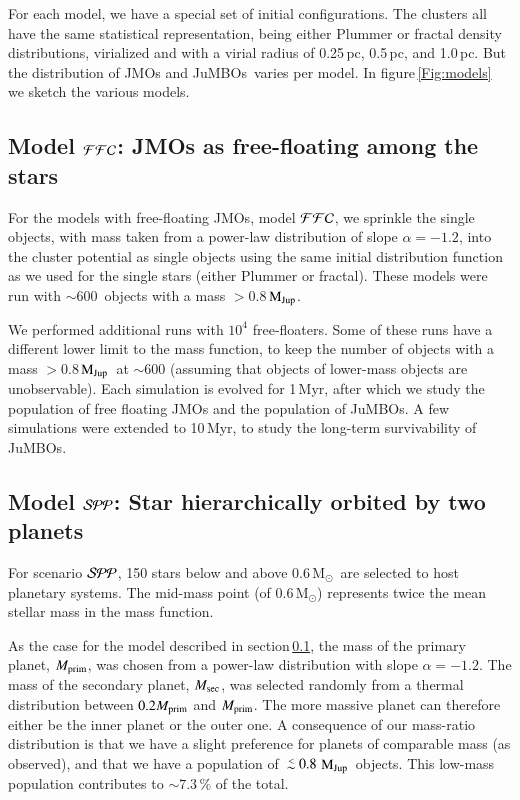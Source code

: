 \documentclass[submission,phys]{lib/SciPost}
\newcommand{\MSun}{\mbox{$\mathrm{{M}}_\odot$}}
\newcommand{\MJup}{\mbox{$\mathrm{{M}}_{\rm Jup}$}}
\def\aplt{\ {\raise-.5ex\hbox{$\buildrel<\over\sim$}}\ }
\newcommand{\jumbos}{\mbox{JuMBOs}}
\begin{document}
For each model, we have a special set of initial
configurations. The clusters all have the same statistical
representation, being either Plummer or fractal density distributions,
virialized and with a virial radius of 0.25\,pc, 0.5\,pc, and
1.0\,pc. But the distribution of JMOs and \jumbos\, varies per model.
In figure\,\ref{Fig:models} we sketch the various models.

\subsection{Model ${\cal FFC}$: JMOs as free-floating among the stars}\label{Sect:FFC}

For the models with free-floating JMOs, model ${\cal FFC}$, 
we sprinkle the single objects, with mass taken from a power-law distribution
of slope $\alpha = -1.2$, into the cluster potential as single
objects using the same initial distribution function as we used for
the single stars (either Plummer or fractal).  These models were run
with $\sim 600$\, objects with a mass $>0.8$\,\MJup. 

We performed additional runs with $10^4$ free-floaters. Some of these
runs have a different lower limit to the mass function, to keep the
number of objects with a mass $>0.8$\,\MJup\, at $\sim 600$ (assuming
that objects of lower-mass objects are unobservable).  Each simulation
is evolved for 1\,Myr, after which we study the population of free
floating JMOs and the population of \jumbos. A few
simulations were extended to 10\,Myr, to study the long-term
survivability of \jumbos.

\subsection{Model ${\cal SPP}$: Star hierarchically orbited by two planets}

For scenario ${\cal SPP}$, 150 stars below and above 0.6\,\MSun\,
are selected to host planetary systems. The mid-mass point (of 0.6\,$\MSun$) 
represents twice the mean stellar mass in the mass function.

As the case for the model described in section\,\ref{Sect:FFC}, the
mass of the primary planet, $M_{\rm prim}$, was chosen from a
power-law distribution with slope $\alpha=-1.2$. The mass of the
secondary planet, $M_{\rm sec}$, was selected randomly from a thermal
distribution between $0.2 M_{\rm prim}$ and $M_{\rm prim}$.  The more
massive planet can therefore either be the inner planet or the outer
one. A consequence of our mass-ratio distribution is that we have a
slight preference for planets of comparable mass (as observed), and
that we have a population of $\aplt 0.8$\,\MJup\, objects. This
low-mass population contributes to $\sim 7.3$\,\% of the total.
\end{document}
